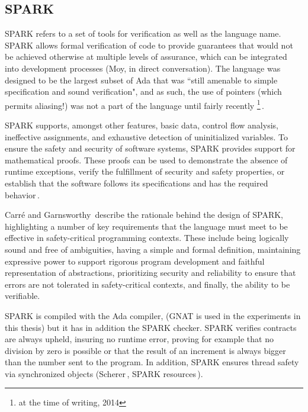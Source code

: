 \documentclass[nomenclature, english, bibtex]{kththesis}
\begin{document}
\subsection{SPARK}


SPARK refers to a set of tools for verification as well as the language name.
SPARK allows formal verification of code to provide guarantees that would not be achieved otherwise at multiple levels of assurance, which can be integrated into development processes (Moy, in direct conversation). The language was designed to be the largest subset of Ada that was ``still amenable to simple specification and sound verification", and as such, the use of pointers (which permits aliasing!) was not a part of the language until fairly recently \footnote{at the time of writing, 2014}\,\cite{jaloyan_safe_2017, dross_using_2019}.

 SPARK supports, amongst other features, basic data, control flow analysis, ineffective assignments, and exhaustive detection of uninitialized variables. To ensure the safety and security of software systems, SPARK provides support for mathematical proofs. These proofs can be used to demonstrate the absence of runtime exceptions, verify the fulfillment of security and safety properties, or establish that the software follows its specifications and has the required behavior\,\cite{noauthor_spark_nodate}.
 
Carré and Garnsworthy\,\cite{carre_spark_1990} describe the rationale behind the design of SPARK, highlighting a number of key requirements that the language must meet to be effective in safety-critical programming contexts. These include being logically sound and free of ambiguities, having a simple and formal definition, maintaining expressive power to support rigorous program development and faithful representation of abstractions, prioritizing security and reliability to ensure that errors are not tolerated in safety-critical contexts, and finally, the ability to be verifiable.

SPARK is compiled with the Ada compiler, (GNAT is used in the experiments in this thesis) but it has in addition the SPARK checker. SPARK verifies contracts are always upheld, insuring no runtime error, proving for example that no division by zero is possible or that the result of an increment is always bigger than the number sent to the program. In addition, SPARK ensures thread safety via synchronized objects (Scherer\,\cite{scherer_engineering_2021}, SPARK resources\,\cite{noauthor_spark_nodate}).
\end{document}
